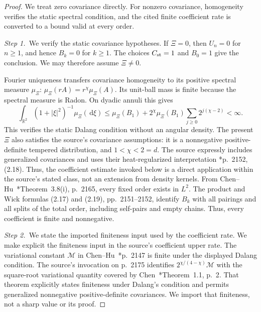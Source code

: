\documentclass[12pt,oneside,openany]{book}
\numberwithin{equation}{section}
\theoremstyle{nogostyle}
\theoremstyle{definition}
\newcommand{\R}{\mathbb{R}}
\newcommand{\ud}{\,\mathrm{d}}
\begin{document}
\begin{proof}
  We treat zero covariance directly. For nonzero covariance, homogeneity
  verifies the static spectral condition, and the cited finite coefficient
  rate is converted to a bound valid at every order.


  \medskip
  \noindent\textit{Step 1.~}We verify the static covariance hypotheses.
  If $\Xi = 0$, then $U_n = 0$ for $n \ge 1$, and hence $B_k = 0$ for $k \ge 1$.
  The choices $C_{\rm st} = 1$ and $B_0 = 1$ give the conclusion. We may
  therefore assume $\Xi \ne 0$.

  Fourier uniqueness transfers covariance homogeneity to its positive spectral
  measure $\mu_\Xi$: $\mu_\Xi(rA) = r^\chi\mu_\Xi(A)$. Its unit-ball mass is
  finite because the spectral measure is Radon. On dyadic annuli this gives
  \[
    \int_{\R^2}(1+|\xi|^2)^{-1}\mu_\Xi(\ud\xi)
    \le\mu_\Xi(B_1)
    +2^\chi\mu_\Xi(B_1)\sum_{j\ge0}2^{j(\chi-2)}<\infty.
  \]
  This verifies the static Dalang condition without an angular density. The
  present $\Xi$ also satisfies the source's covariance assumptions: it is a
  nonnegative positive-definite tempered distribution, and $1 < \chi < 2 = d$.
  The source expressly includes generalized covariances and uses their
  heat-regularized interpretation \cite{chen.hu:25:hyperbolic}*{p.~2152,
  (2.18)}. Thus, the coefficient estimate invoked below is a direct application
  within the source's stated class, not an extension from density kernels. From
  Chen--Hu~\cite{chen.hu:25:hyperbolic}*{Theorem~3.8(i), p.~2165}, every fixed
  order exists in $L^2$. The product and Wick formulas (2.17) and (2.19),
  pp.~2151--2152, identify $B_k$ with all pairings and all splits of the total
  order, including self-pairs and empty chains. Thus, every coefficient is
  finite and nonnegative.


  \medskip
  \noindent\textit{Step 2.~}We state the imported finiteness input used by the
  coefficient rate.
  We make explicit the finiteness input in the source's coefficient upper rate.
  The variational constant $\mathcal{M}$ in
  Chen--Hu~\cite{chen.hu:25:hyperbolic}*{p.~2147} is finite under the displayed
  Dalang condition. The source's invocation on p.~2175 identifies
  $2^{\chi/(4-\chi)}\mathcal{M}$ with the square-root variational quantity
  covered by Chen~\cite{chen:23:exponential}*{Theorem~1.1, p.~2}. That theorem
  explicitly states finiteness under Dalang's condition and permits generalized
  nonnegative positive-definite covariances. We import that finiteness, not a
  sharp value or its proof.



\end{proof}
\end{document}
